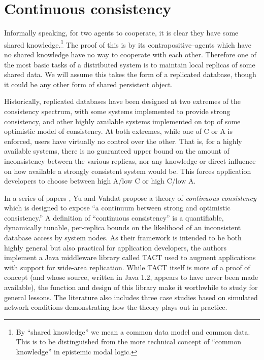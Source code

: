 \section{Continuous consistency}


Informally speaking, for two agents to cooperate, it is clear they have some
shared knowledge.\footnote{By ``shared knowledge'' we mean a common data model
and common data. This is to be distinguished from the more technical concept of
``common knowledge'' in epistemic modal logic.} The proof of this is by its
contrapositive--agents which have no shared knowledge have no way to cooperate
with each other. Therefore one of the most basic tasks of a distributed system
is to maintain local replicas of some shared data. We will assume this takes the
form of a replicated database, though it could be any other form of shared
persistent object.

Historically, replicated databases have been designed at two extremes of the
consistency spectrum, with some systems implemented to provide strong
consistency, and other highly available systems implemented on top of some
optimistic model of consistency. At both extremes, while one of C or A is
enforced, users have virtually no control over the other. That is, for a highly
available systems, there is no guaranteed upper bound on the amount of
inconsistency between the various replicas, nor any knowledge or direct
influence on how available a strongly consistent system would be. This forces
application developers to choose between high A/low C or high C/low A.

In a series of papers \cite{2000tact} \cite{2000tactalgorithms} \cite{2002tact},
Yu and Vahdat propose a theory of \emph{continuous consistency} which is
designed to expose ``a continuum between strong and optimistic consistency.''  A
definition of  ``continuous consistency'' is a quantifiable, dynamically
tunable, per-replica bounds on the likelihood of an inconsistent database access
by system nodes. As their framework is intended to be both highly general but
also practical for application developers, the authors implement a Java
middleware library called TACT used to augment applications with support for
wide-area replication. While TACT itself is more of a proof of concept (and
whose source, written in Java 1.2, appears to have never been made available),
the function and design of this library make it worthwhile to study for general
lessons. The literature also includes three case studies based on simulated
network conditions demonstrating how the theory plays out in practice.
\cite{2002tact}

